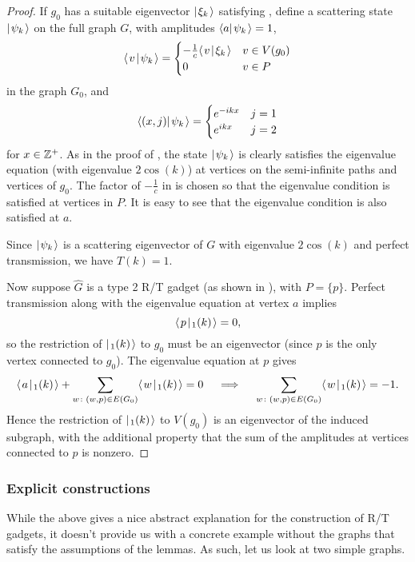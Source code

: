 \documentclass[../thesis-main/thesis-main]{subfiles}
\begin{document}
\begin{proof}
If $g_0$ has a suitable eigenvector $|\mspace{2mu} \xi_k \mspace{2mu} \rangle$ satisfying , define a scattering state $|\mspace{2mu} \psi_k \mspace{2mu} \rangle$ on the full graph $G$, with amplitudes $\langle a|\mspace{2mu} \psi_k \mspace{2mu} \rangle=1$, 
\begin{equation}
  \langle\mspace{2mu} v \mspace{2mu} | \mspace{2mu} \psi_k\mspace{2mu} \rangle 
  = \begin{cases} -\frac{1}{c} \langle\mspace{2mu} v \mspace{2mu} | \mspace{2mu} \xi_k\mspace{2mu} \rangle & v\in V(g_0)\\
  	0 & v \in P
\end{cases}
\label{eq:psik_c}
\end{equation}
in the graph $G_0$, and 
\[
 \langle{(x,j)} |\mspace{2mu} \psi_k \mspace{2mu} \rangle=\begin{cases} e^{-ikx} & j=1\\
 e^{ikx} & j=2
\end{cases}
\]
for $x \in \mathbb{Z}^+$.  As in the proof of , the state $|\mspace{2mu} \psi_k \mspace{2mu} \rangle$ is clearly satisfies the eigenvalue equation (with eigenvalue $2\cos(k)$) at vertices on the semi-infinite paths and vertices of $g_0$.  The factor of $-\frac{1}{c}$ in  is chosen so that the eigenvalue condition is satisfied at vertices in $P$.  It is easy to see that the eigenvalue condition is also satisfied at $a$.

Since $|\mspace{2mu} \psi_k \mspace{2mu} \rangle$ is a scattering eigenvector of $G$ with eigenvalue $2\cos(k)$ and perfect transmission, we have $T(k)=1$.

Now suppose $\hat{G}$ is a type 2 R/T gadget (as shown in ), with $P = \{p\}$.  Perfect transmission along with the eigenvalue equation at vertex $a$ implies
\[
\langle\mspace{2mu} p \mspace{2mu} | \mspace{2mu} \sc_1(k)\mspace{2mu} \rangle = 0,
\]
so the restriction of $|\mspace{2mu} \sc_1(k) \mspace{2mu} \rangle$ to $g_0$ must be an eigenvector (since $p$ is the only vertex connected to $g_0$).  The eigenvalue equation at $p$ gives
\[
  \langle\mspace{2mu} a \mspace{2mu} | \mspace{2mu} \sc_1(k)\mspace{2mu} \rangle 
  + \sum_{w \colon (w,p)\in E(G_0)} \langle\mspace{2mu} w \mspace{2mu} | \mspace{2mu} \sc_1(k)\mspace{2mu} \rangle = 0 
  \quad\implies\quad
  \sum_{w \colon (w,p)\in E(G_0)} \langle\mspace{2mu} w \mspace{2mu} | \mspace{2mu} \sc_1(k)\mspace{2mu} \rangle = -1.
\]
Hence the restriction of $|\mspace{2mu} \sc_1(k) \mspace{2mu} \rangle$ to $V(g_0)$ is an eigenvector of the induced subgraph, with the additional property that the sum of the amplitudes at vertices connected to $p$ is nonzero.
\end{proof}

\subsubsection{Explicit constructions}

While the above gives a nice abstract explanation for the construction of R/T gadgets, it doesn't provide us with a concrete example without the graphs that satisfy the assumptions of the lemmas.  As such, let us look at two simple graphs.
\end{document}
